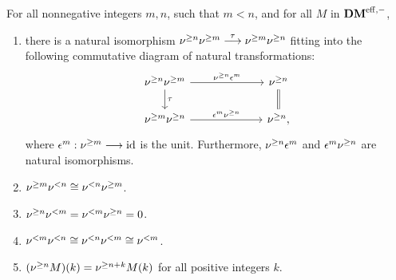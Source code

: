 \begin{prop}\label{prop_sDM_properties}
For all nonnegative integers $m, n$, such that $m < n$, and
for all $M$ in $\DMeff$,

\begin{enumerate}
\item there is a natural isomorphism
$\sgDM{n}\sgDM{m} \stackrel{\tau}{\to} \sgDM{m}\sgDM{n}$
fitting into the following commutative diagram of natural
transformations:
\begin{equation}\label{eq_prop_sg_commute_sg}
\begin{tikzcd}[column sep=65pt]
\sgDM{n} \sgDM{m} \arrow{r}{\sgDM{n}\epsilon^m} \arrow{d}{\tau} 
&\sgDM{n} \arrow[equals]{d} \\
\sgDM{m} \sgDM{n} \arrow{r}{\epsilon^m \sgDM{n}}
&\sgDM{n},
\end{tikzcd}
\end{equation}
where $\epsilon^m : \sgDM{m} \to \id$ is the unit. Furthermore,
$\sgDM{n} \epsilon^m$ and $\epsilon^m \sgDM{n}$ are natural
isomorphisms.

\item $\sgDM{m}\slDM{n} \cong \slDM{n}\sgDM{m}$.

\item $\sgDM{n}\slDM{m} = \slDM{m}\sgDM{n} = 0$.

\item $\slDM{m}\slDM{n} \cong \slDM{n}\slDM{m} \cong \slDM{m}$.

\item $\tZ[k]{(\sgDM{n}M)} = \sgDM{n + k}\tZ[k]{M}$ for all 
positive integers $k$.

\end{enumerate}
\end{prop}
